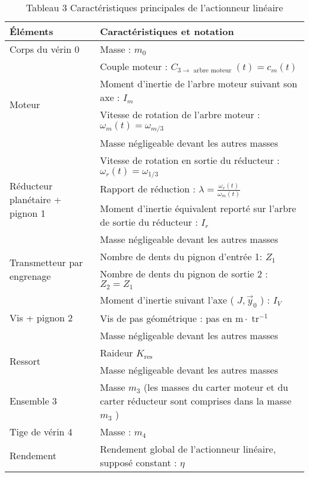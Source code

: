 \begin{table}[h]
\begin{center}
\begin{tabular}{|l|l|}
\hline
Éléments & Caractéristiques et notation \\
\hline
Corps du vérin 0 & Masse : $m_{0}$ \\
\hline
\multirow[t]{4}{*}{Moteur} & Couple moteur : $C_{3 \rightarrow \text { arbre moteur }}(t)=c_{m}(t)$ \\
\hline
 & Moment d'inertie de l'arbre moteur suivant son axe : $I_{m}$ \\
\hline
 & Vitesse de rotation de l'arbre moteur : $\omega_{m}(t)=\omega_{m / 3}$ \\
\hline
 & Masse négligeable devant les autres masses \\
\hline
\multirow[t]{4}{*}{Réducteur planétaire + pignon 1} & Vitesse de rotation en sortie du réducteur : $\omega_{r}(t)=\omega_{1 / 3}$ \\
\hline
 & Rapport de réduction : $\lambda=\frac{\omega_{r}(t)}{\omega_{m}(t)}$ \\
\hline
 & Moment d'inertie équivalent reporté sur l'arbre de sortie du réducteur : $I_{r}$ \\
\hline
 & Masse négligeable devant les autres masses \\
\hline
\multirow[t]{2}{*}{Transmetteur par engrenage} & Nombre de dents du pignon d'entrée 1: $Z_{1}$ \\
\hline
 & Nombre de dents du pignon de sortie 2 : $Z_{2}=Z_{1}$ \\
\hline
\multirow[t]{3}{*}{Vis + pignon 2} & Moment d'inertie suivant l'axe ( $J, \vec{y}_{0}$ ) : $I_{V}$ \\
\hline
 & Vis de pas géométrique : pas en $\mathrm{m} \cdot \operatorname{tr}^{-1}$ \\
\hline
 & Masse négligeable devant les autres masses \\
\hline
\multirow[t]{2}{*}{Ressort} & Raideur $K_{\text {res }}$ \\
\hline
 & Masse négligeable devant les autres masses \\
\hline
Ensemble 3 & Masse $m_{3}$ (les masses du carter moteur et du carter réducteur sont comprises dans la masse $m_{3}$ ) \\
\hline
Tige de vérin 4 & Masse : $m_{4}$ \\
\hline
Rendement & Rendement global de l'actionneur linéaire, supposé constant : $\eta$ \\
\hline
\end{tabular}
\captionsetup{labelformat=empty}
\caption{Tableau 3 Caractéristiques principales de l'actionneur linéaire}
\end{center}
\end{table}

